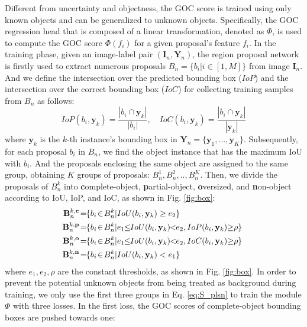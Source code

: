 \documentclass[10pt,twocolumn,letterpaper]{article}
\newcommand{\xf}[1]{{\color{black} #1}}
\newcommand{\ood}{unknown objects\xspace}
\begin{document}
Different from uncertainty and objectness,
the GOC score is trained using only known objects and can be generalized to unknown objects.
Specifically,
the GOC regression head that is composed of a linear transformation, denoted as $\Phi$, is used to compute the GOC score $\Phi(f_i)$ for a given proposal's feature $f_i$.
In the training phase,
given an image-label pair $(\mathbf{I}_n,\mathbf{Y}_n)$,
the region proposal network is firstly used to extract numerous proposals $B_n=\{b_i|i\in[1,M]\}$ from image $\mathbf{I}_n$.
And we define the intersection over the predicted bounding box ($IoP$) and \xf{the} intersection over the correct bounding box ($IoC$) for collecting training samples from $B_n$ as follows:
\vspace{-6pt}
\begin{equation}
IoP(b_i, \mathbf{y}_k)=\frac{|b_i \cap \mathbf{y}_k|}{|b_i|}, \quad IoC(b_i, \mathbf{y}_k)=\frac{|b_i \cap \mathbf{y}_k|}{|\mathbf{y}_k|}
\label{eq:IoPIoC}
\end{equation}
where $\mathbf{y}_k$ is the $k$-th instance's bounding box in $\mathbf{Y}_n\!\!\!=\!\!\!\{\mathbf{y}_1,...,\mathbf{y}_K\}$.
Subsequently, for each proposal $b_i$ in $B_n$,
we find the object instance \xf{that has} the maximum IoU with $b_i$.
And the proposals enclosing the same object are assigned to the same group,
obtaining $K$ groups of proposals: $B^1_n,B^2_n,..,B^K_n$.
Then,
we divide the proposals of $B^k_n$ into \textbf{c}omplete-object, \textbf{p}artial-object, \textbf{o}versized, and \textbf{n}on-object according to IoU, IoP, and IoC,
as shown in Fig. \ref{fig:box}:
\begin{equation}
\centering
\begin{split}
\!\!\!\mathbf{B}^{k,\mathbf{c}}_{n} \!&=\!\! \{b_i\!\in\! B^k_n | IoU(b_i, \mathbf{y}_k) \geq e_2\}\! \\
\!\!\!\mathbf{B}^{k,\mathbf{p}}_{n} \!&=\!\! \{b_i\!\in\! B^k_n | e_1 \!\!\leq\!\! IoU(b_i, \mathbf{y}_k)\!\!<\!\!e_2, IoP(b_i, \mathbf{y}_k) {\geq} {\rho}\}\! \\
\!\!\!\mathbf{B}^{k,\mathbf{o}}_{n} \!&=\!\! \{b_i\!\in\! B^k_n | e_1 \!\!\leq\!\! IoU(b_i, \mathbf{y}_k)\!\!<\!\!e_2, IoC(b_i, \mathbf{y}_k) {\geq} {\rho}\}\! \\
\!\!\!\mathbf{B}^{k,\mathbf{n}}_{n} \!&=\!\! \{b_i\!\in\! B^k_n | IoU(b_i, \mathbf{y}_k) < e_1\}\! \\
\end{split}
\label{eq:S_plsn}
\end{equation}
where $e_1, e_2, \rho$ are the constant thresholds,
as shown in Fig. \ref{fig:box}.
In order to prevent the potential \ood from being \xf{treated} as background during training,
we only use the first three groups in Eq. \ref{eq:S_plsn} to train the module $\Phi$ \xf{with} three losses.
In the first loss,
the GOC scores of complete-object bounding boxes are pushed towards one:
\end{document}
